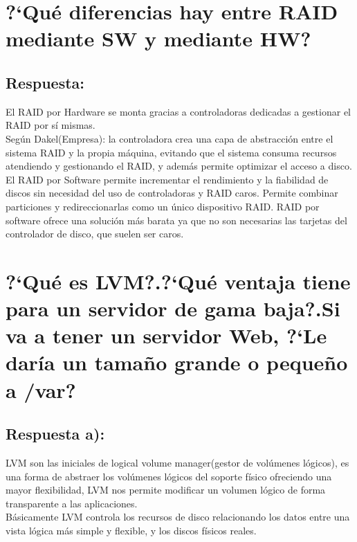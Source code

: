 \section{?`Qué diferencias hay entre RAID mediante SW y mediante HW?}
\subsection{Respuesta:}
El RAID por Hardware se monta gracias a controladoras dedicadas a gestionar el RAID por sí mismas. \cite{RAIDRed_Hat} \\
Según Dakel(Empresa): la controladora crea una capa de abstracción entre el sistema RAID y la propia máquina, evitando que el sistema consuma recursos atendiendo y gestionando el RAID, y además permite optimizar el acceso a disco. \cite{cuestion6A}\newpage
El RAID por Software permite incrementar el rendimiento y la fiabilidad de discos sin necesidad del uso de controladoras y RAID caros. Permite combinar particiones y redireccionarlas como un único dispositivo RAID. RAID por software ofrece una solución más barata ya que no son necesarias las tarjetas del controlador de disco, que suelen ser caros.\cite{RAIDSWGentoo}\cite{RAIDRed_Hat}

\section{?`Qué es LVM?.?`Qué ventaja tiene para un servidor de gama baja?.Si va a tener un servidor Web, ?`Le daría un tamaño grande o pequeño a /var?}
\subsection{Respuesta a):}
 LVM son las iniciales de logical volume manager(gestor de volúmenes lógicos), es una forma de abstraer los volúmenes lógicos del soporte físico ofreciendo una mayor flexibilidad, LVM nos permite modificar un volumen lógico de forma transparente a las aplicaciones.\cite{ManualDebian}\\
 Básicamente LVM controla los recursos de disco relacionando los datos entre una vista lógica más simple y flexible, y los discos físicos reales.\cite{IBMLVM}

